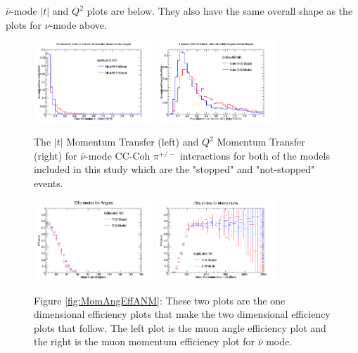 \documentclass[11pt]{article}
\begin{document}
$\bar{\nu}$-mode $|t|$ and $Q^2$ plots are below. They also have the same overall shape as the plots for $\nu$-mode above.

\begin{figure}[H]
\centering
\includegraphics[width=0.4\textwidth]{CCCohPlots/ANMCCCohGoodT.png}
\includegraphics[width=0.4\textwidth]{CCCohPlots/ANMCCCohGoodQ2.png}
\caption{The $|t|$ Momentum Transfer (left) and $Q^2$ Momentum Transfer (right) for $\bar{\nu}$-mode CC-Coh $\pi^{+/-}$ interactions for both of the models included in this study which are the "stopped" and "not-stopped" events.}
\end{figure}\label{fig:AntiNuModeCCCohGoodTAndQ2}




\begin{figure}[H]
\centering
\includegraphics[width=0.4\textwidth]{ANMCombinedPlotsImages/17-ANMCombinedPlots.png}
\includegraphics[width=0.4\textwidth]{ANMCombinedPlotsImages/18-ANMCombinedPlots.png}
\caption*{Figure \ref*{fig:MomAngEffANM}:  These two plots are the one dimensional efficiency plots that make the two dimensional efficiency plots that follow. The left plot is the muon angle efficiency plot and the right is the muon momentum efficiency plot for $\bar{\nu}$ mode.}
\end{figure}\label{fig:MomAngEffANM}
\end{document}
